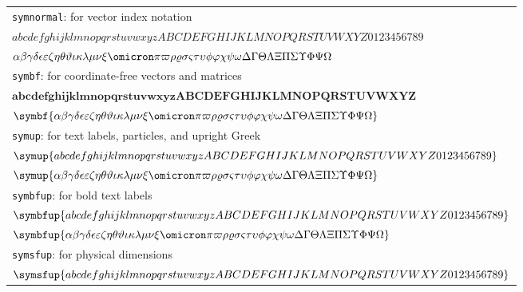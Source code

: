 \documentclass{article}
\begin{document}
\begin{center}
  \begin{tabular}{l}
    \texttt{symnormal}: for vector index notation                                    \\
    \( abcdefghijklmnopqrstuvwxyzABCDEFGHIJKLMNOPQRSTUVWXYZ0123456789 \)             \\
    \( 
      \alpha\beta\gamma\delta\epsilon\varepsilon\zeta\eta\theta\vartheta\iota\kappa
      \lambda\mu\nu\xi\omicron\pi\varpi\rho\varrho\sigma\varsigma\tau\upsilon\phi\varphi
      \chi\psi\omega\Delta\Gamma\Theta\Lambda\Xi\Pi\Sigma\Upsilon\Phi\Psi\Omega 
    \) \\
    \texttt{symbf}: for coordinate-free vectors and matrices                         \\
    \( \symbf{abcdefghijklmnopqrstuvwxyzABCDEFGHIJKLMNOPQRSTUVWXYZ} \)               \\
    \( \symbf{ 
       \alpha\beta\gamma\delta\epsilon\varepsilon\zeta\eta\theta\vartheta\iota\kappa
       \lambda\mu\nu\xi\omicron\pi\varpi\rho\varrho\sigma\varsigma\tau\upsilon\phi\varphi
       \chi\psi\omega\Delta\Gamma\Theta\Lambda\Xi\Pi\Sigma\Upsilon\Phi\Psi\Omega}
    \) \\
    \texttt{symup}: for text labels, particles, and upright Greek                    \\
    \( \symup{abcdefghijklmnopqrstuvwxyzABCDEFGHIJKLMNOPQRSTUVWXYZ0123456789} \)     \\
    \( \symup{ 
      \alpha\beta\gamma\delta\epsilon\varepsilon\zeta\eta\theta\vartheta\iota\kappa
      \lambda\mu\nu\xi\omicron\pi\varpi\rho\varrho\sigma\varsigma\tau\upsilon\phi\varphi
      \chi\psi\omega\Delta\Gamma\Theta\Lambda\Xi\Pi\Sigma\Upsilon\Phi\Psi\Omega}
    \) \\
    \texttt{symbfup}: for bold text labels                                           \\
    \( \symbfup{abcdefghijklmnopqrstuvwxyzABCDEFGHIJKLMNOPQRSTUVWXYZ0123456789} \)   \\
    \( \symbfup{ 
       \alpha\beta\gamma\delta\epsilon\varepsilon\zeta\eta\theta\vartheta\iota\kappa
       \lambda\mu\nu\xi\omicron\pi\varpi\rho\varrho\sigma\varsigma\tau\upsilon\phi\varphi
       \chi\psi\omega\Delta\Gamma\Theta\Lambda\Xi\Pi\Sigma\Upsilon\Phi\Psi\Omega}
    \) \\
    \texttt{symsfup}: for physical dimensions                                        \\
    \( \symsfup{abcdefghijklmnopqrstuvwxyzABCDEFGHIJKLMNOPQRSTUVWXYZ0123456789} \)   \\

\end{tabular}
\end{center}
\end{document}
